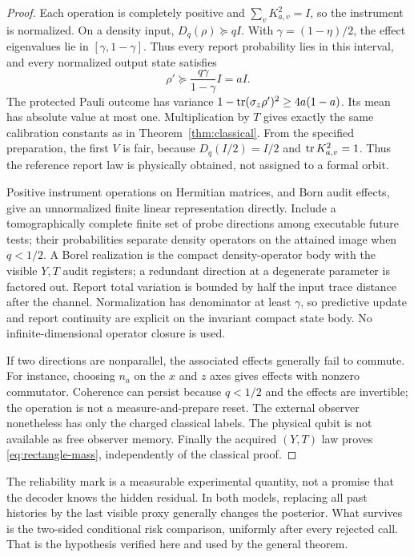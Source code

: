\begin{proof}
Each operation is completely positive and $\sum_vK_{a,v}^2=I$, so the instrument is normalized. On a density input, $D_q(\rho)\succeq qI$. With $\gamma=(1-\eta)/2$, the effect eigenvalues lie in $[\gamma,1-\gamma]$. Thus every report probability lies in this interval, and every normalized output state satisfies
\[
 \rho'\succeq \frac{q\gamma}{1-\gamma}I=aI.
\]
The protected Pauli outcome has variance $1-\operatorname{tr}(\sigma_z\rho')^2\ge4a(1-a)$. Its mean has absolute value at most one. Multiplication by $T$ gives exactly the same calibration constants as in Theorem~\ref{thm:classical}. From the specified preparation, the first $V$ is fair, because $D_q(I/2)=I/2$ and $\operatorname{tr} K_{a,v}^2=1$. Thus the reference report law is physically obtained, not assigned to a formal orbit.

Positive instrument operations on Hermitian matrices, and Born audit effects, give an unnormalized finite linear representation directly. Include a tomographically complete finite set of probe directions among executable future tests; their probabilities separate density operators on the attained image when $q<1/2$. A Borel realization is the compact density-operator body with the visible $Y,T$ audit registers; a redundant direction at a degenerate parameter is factored out. Report total variation is bounded by half the input trace distance after the channel. Normalization has denominator at least $\gamma$, so predictive update and report continuity are explicit on the invariant compact state body. No infinite-dimensional operator closure is used.

If two directions are nonparallel, the associated effects generally fail to commute. For instance, choosing $n_a$ on the $x$ and $z$ axes gives effects with nonzero commutator. Coherence can persist because $q<1/2$ and the effects are invertible; the operation is not a measure-and-prepare reset. The external observer nonetheless has only the charged classical labels. The physical qubit is not available as free observer memory. Finally the acquired $(Y,T)$ law proves \eqref{eq:rectangle-mass}, independently of the classical proof.
\end{proof}

The reliability mark is a measurable experimental quantity, not a promise that the decoder knows the hidden residual. In both models, replacing all past histories by the last visible proxy generally changes the posterior. What survives is the two-sided conditional risk comparison, uniformly after every rejected call. That is the hypothesis verified here and used by the general theorem.
